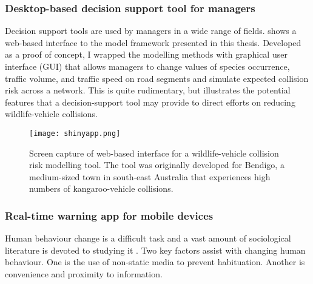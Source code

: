 \subsubsection{Desktop-based decision support tool for managers}

Decision support tools are used by managers in a wide range of fields.
 shows a web-based interface to the model framework presented in this thesis. Developed as a proof of concept, I wrapped the modelling methods with graphical user interface (GUI) that allows managers to change values of species occurrence, traffic volume, and traffic speed on road segments and simulate expected collision risk across a network. This is quite rudimentary, but illustrates the potential features that a decision-support tool may provide to direct efforts on reducing wildlife-vehicle collisions.

\begin{figure*}[htp]
  \centering
  \texttt{[image: shinyapp.png]}
  \caption[Decision support tool for wildlife-vehicle collisions]{Screen capture of web-based interface for a wildlife-vehicle collision risk modelling tool. The tool was originally developed for Bendigo, a medium-sized town in south-east Australia that experiences high numbers of kangaroo-vehicle collisions.}
  \label{wvc_tool}
\end{figure*}

\subsubsection{Real-time warning app for mobile devices}

Human behaviour change is a difficult task and a vast amount of sociological literature is devoted to studying it \citep{}.
Two key factors assist with changing human behaviour.
One is the use of non-static media to prevent habituation.
Another is convenience and proximity to information.
